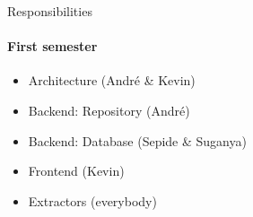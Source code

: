 \begin{frame}{Responsibilities}
\framesubtitle{First semester}
	\begin{itemize}
		\item Architecture (André \& Kevin)
		\item Backend: Repository (André)
		\item Backend: Database (Sepide \& Suganya)
		\item Frontend (Kevin)
		\item Extractors (everybody)
	\end{itemize}
\end{frame}